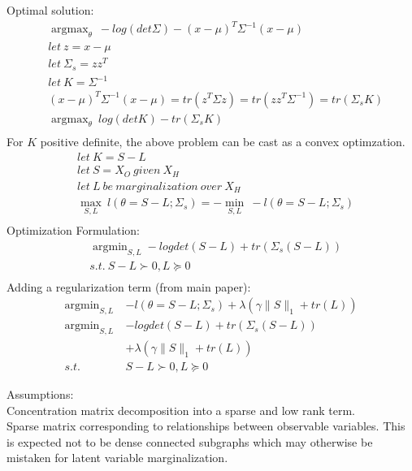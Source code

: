 \documentclass[10pt,conference]{IEEEtran}
\DeclareMathOperator*{\argmin}{argmin}
\DeclareMathOperator*{\argmax}{argmax}
\begin{document}
Optimal solution:
\begin{align*}
  & \argmax_{\theta}\ -log(det \Sigma) - (x-\mu)^T \Sigma^{-1}(x-\mu)\\
  &let\ z= x-\mu\\
  &let\ \Sigma_{s}= zz^T\\
  &let\ K = \Sigma^{-1}\\
  &(x-\mu)^T \Sigma^{-1}(x-\mu) = tr(z^T \Sigma z) = tr(zz^T \Sigma^{-1}) = tr(\Sigma_{s} K)\\
  & \argmax_{\theta}\ log(det K) - tr(\Sigma_{s} K)\\
\end{align*}
For $K$ positive definite, the above problem can be cast as a convex optimzation.
\begin{align*}
  &let\ K=S-L\\
  &let\ S = X_O\ given\ X_H\\
  &let\ L\ be\ marginalization\ over\ X_H\\
  &\max_{S,L}\ l(\theta=S-L; \Sigma_{s}) = -\min_{S,L}\ -l(\theta=S-L; \Sigma_{s})\\
\end{align*}
Optimization Formulation:
\begin{align*}
  &\argmin_{S,L} -log det(S-L) + tr(\Sigma_{s}(S-L))\\
  &s.t.\ S-L \succ 0, L \succeq 0\\
\end{align*}
Adding a regularization term (from main paper):
\begin{align*}
  \argmin_{S,L}\ & -l(\theta=S-L; \Sigma_{s}) + \lambda(\gamma \|S\|_1 + tr(L))\\
  \argmin_{S,L}\ & -log det(S-L) + tr(\Sigma_{s}(S-L))\\
                 & + \lambda(\gamma \|S\|_1 + tr(L))\\
  s.t.\ & S-L \succ 0, L \succeq 0
\end{align*}

\vfill\null

\pagebreak

Assumptions:\\

Concentration matrix decomposition into a sparse and low rank term.\\
Sparse matrix corresponding to relationships between observable variables. This is expected not to be dense connected subgraphs which may otherwise be mistaken for latent variable marginalization.\\
\end{document}
